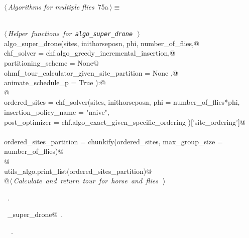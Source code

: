 \documentclass[11.5pt]{report}
\begin{document}
\begin{flushleft} \small
\begin{minipage}{\linewidth}\label{scrap112}\raggedright\small
{} $\langle\,${\itshape Algorithms for multiple flies}\nobreak\ {\footnotesize {75a}}$\,\rangle\equiv$
\vspace{-1ex}
\begin{list}{}{} \item
\mbox{}\verb@@\\
\mbox{}\verb@@\hbox{$\langle\,${\itshape Helper functions for \verb|algo_super_drone|}\nobreak\ {\footnotesize {}}$\,\rangle$}\verb@@\\
\mbox{}\verb@def algo_super_drone(sites, inithorseposn, phi, number_of_flies,@\\
\mbox{}\verb@                     chf_solver                                = chf.algo_greedy_incremental_insertion,@\\
\mbox{}\verb@                     partitioning_scheme                       = None@\\
\mbox{}\verb@                     ohmf_tour_calculator_given_site_partition = None   ,@\\
\mbox{}\verb@                     animate_schedule_p                        = True  ):@\\
\mbox{}\verb@    @\\
\mbox{}\verb@    ordered_sites = chf_solver(sites, inithorseposn, phi = number_of_flies*phi,      \@\\
\mbox{}\verb@                               insertion_policy_name = "naive",                      \@\\
\mbox{}\verb@                               post_optimizer = chf.algo_exact_given_specific_ordering )['site_ordering']@\\
\mbox{}\verb@@\\
\mbox{}\verb@    ordered_sites_partition = chunkify(ordered_sites, max_group_size = number_of_flies)@\\
\mbox{}\verb@    @\\
\mbox{}\verb@    utils_algo.print_list(ordered_sites_partition)@\\
\mbox{}\verb@    @\hbox{$\langle\,${\itshape Calculate and return tour for horse and flies}\nobreak\ {\footnotesize {}}$\,\rangle$}\verb@@\\
\mbox{}\verb@@{\NWsep}
\end{list}
\vspace{-1.5ex}
\footnotesize
\begin{list}{}{\setlength{\itemsep}{-\parsep}\setlength{\itemindent}{-\leftmargin}}
\item \NWtxtMacroRefIn\ .
\item \NWtxtIdentsDefed\nobreak\  \verb@algo_super_drone@\nobreak\ .\item \NWtxtIdentsUsed\nobreak\  \verb@chunkify@\nobreak\ .
\item{}
\end{list}
\end{minipage}\vspace{4ex}
\end{flushleft}
\end{document}
